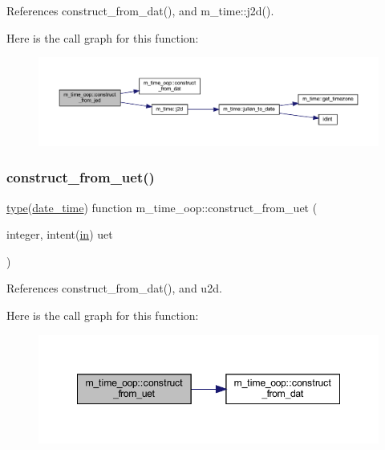 References construct\+\_\+from\+\_\+dat(), and m\+\_\+time\+::j2d().

Here is the call graph for this function\+:
\nopagebreak
\begin{figure}[H]
\begin{center}
\leavevmode
\includegraphics[width=350pt]{namespacem__time__oop_ac7d9aa1885c2b8df613541be8a147064_cgraph}
\end{center}
\end{figure}
\mbox{\label{namespacem__time__oop_ae952d7599526f1b2632452d00363add3}} 
\subsubsection{\texorpdfstring{construct\+\_\+from\+\_\+uet()}{construct\_from\_uet()}}
{\footnotesize\ttfamily \hyperlink{stop__watch_83_8txt_a70f0ead91c32e25323c03265aa302c1c}{type}(\hyperlink{structm__time__oop_1_1date__time}{date\+\_\+time}) function m\+\_\+time\+\_\+oop\+::construct\+\_\+from\+\_\+uet (\begin{DoxyParamCaption}\item[{integer, intent(\hyperlink{M__journal_83_8txt_afce72651d1eed785a2132bee863b2f38}{in})}]{uet }\end{DoxyParamCaption})\hspace{0.3cm}{\ttfamily [private]}}



References construct\+\_\+from\+\_\+dat(), and u2d.

Here is the call graph for this function\+:
\nopagebreak
\begin{figure}[H]
\begin{center}
\leavevmode
\includegraphics[width=348pt]{namespacem__time__oop_ae952d7599526f1b2632452d00363add3_cgraph}
\end{center}
\end{figure}
\mbox{\label{namespacem__time__oop_aecd1edc1f6ca447d5381c8092eba7924}} 
